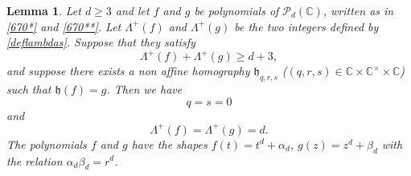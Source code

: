 \documentclass[10pt]{article}
\newtheorem{lemma}[theorem]{Lemma}
\theoremstyle{definition}
\numberwithin{equation}{section}
\newcommand {\C}{{\mathbb{C}}}
\begin{document}
\begin{lemma} \label{896}
Let $d\geqslant 3$ 
and let $f$ and $g$ be polynomials of $\mathcal P_d (\C)$, written as in \eqref{670*} and \eqref{670**}. Let $\Lambda^+(f)$ and $\Lambda^+(g)$ be the two integers defined by \eqref{deflambdas}.
 Suppose that they satisfy
 \begin{equation}\label{e+e>d+1} \Lambda^+ (f) + \Lambda^+ (g) \geqslant d+3,
 \end{equation}
and 
suppose there exists a non affine homography $\mathfrak h_{q,r,s}$ ($(q,r,s) \in \C \times \C^\times \times \C$) such that $\mathfrak h (f) = g$.
 Then we have 
 \[
 q=s=0
 \]
 and 
 \[
 \Lambda^+(f)=\Lambda^+ (g) = d.
 \]
The polynomials $f$ and $g$ have the shapes $f(t) = t^d +\alpha_d$, $g(z) = z^d + \beta_d$ with the relation $\alpha_d \beta_d = r^d$.
\end{lemma}
\end{document}
